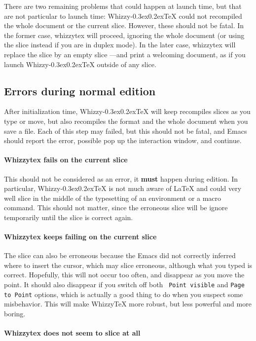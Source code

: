 \documentclass[12pt]{article}
\makeatletter
\def \whizzy {{Whizzy\kern -0.3ex\raise 0.2ex\hbox{\let \@\relax\TeX}}}
\makeatother
\begin{document}
There are two remaining problems that could happen at launch time, but that
are not particular to launch time: {\whizzy} could not recompiled the whole 
document or the current slice. However, these should not be fatal. 
In the former case, whizzytex will proceed, ignoring the whole document 
(or using the slice instead if you are in duplex mode). In the later case,
whizzytex will replace the slice by an empty slice ---and print a welcoming
document, as if you launch {\whizzy} outside of any slice. 

\subsection {Errors during normal edition}

After initialization time, {\whizzy} will keep recompiles slices as you
type or move, but also recompiles the format and the whole document when you
save a file. Each of this step may failed, but this should not be fatal, and
Emacs should report the error, possible pop up the interaction window, and
continue. 

\paragraph {Whizzytex fails on the current slice}

This should not be considered as an error, it {\bf must} happen during
edition. In particular, {\whizzy} is not much aware of {\LaTeX} and could
very well slice in the middle of the typesetting of an environment or a
macro command. This should not matter, since the erroneous slice will be
ignore temporarily until the slice is correct again.

\paragraph {Whizzytex keeps failing on the current slice}

The slice can also be erroneous because the Emacs did not correctly inferred
where to insert the cursor, which may slice erroneous, although what you
typed is correct. Hopefully, this will not occur too often, and disappear as
you move the point. It should also disappear if you switch off both {\tt
Point visible} and {\tt Page to Point} options, which is actually a good
thing to do when you suspect some misbehavior.  This will make WhizzyTeX
more robust, but less powerful and more boring.

\paragraph {Whizzytex does not seem to slice at all}
\end{document}
